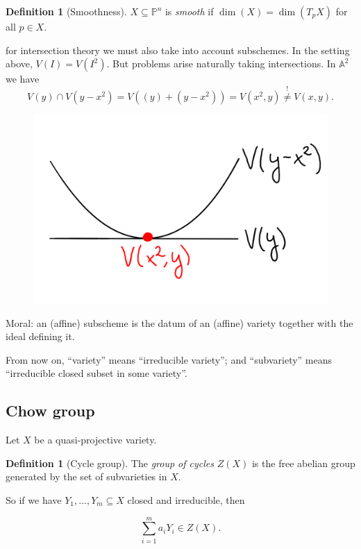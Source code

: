 \documentclass[12pt,a4paper]{amsart}
\theoremstyle{plain}
\theoremstyle{definition}
\newtheorem{defn}[thm]{Definition}
\theoremstyle{remark}
\begin{document}
\begin{defn}[Smoothness]
    $X\subseteq \mathbb{P}^{n}$ is \textit{smooth} if $\dim(X)=\dim(T_{p}X)$ for all $p\in X$.
\end{defn}

\underline{} for intersection theory we must also take into account subschemes.
In the setting above, $V(I)=V(I^{2})$.
But problems arise naturally taking intersections.
In $\mathbb{A}^{2}$ we have
\[ V(y)\cap V(y-x^{2})=V((y)+(y-x^{2}))=V(x^{2},y)\overset{!}{\neq} V(x,y). \]
\begin{figure}[H]
    \centering
    \includegraphics[scale=.15]{pictures/tangent}
\end{figure}

Moral: an (affine) subscheme is the datum of an (affine) variety together with the ideal defining it.

From now on, ``variety'' means ``irreducible variety''; and ``subvariety'' means ``irreducible closed subset in some variety''.

\subsection{Chow group}

Let $X$ be a quasi-projective variety.

\begin{defn}[Cycle group]
    The \textit{group of cycles} $Z(X)$ is the free abelian group generated by the set of subvarieties in $X$.
\end{defn}

So if we have $Y_{1},\ldots,Y_{m}\subseteq X$ closed and irreducible, then

\[ \sum_{i=1}^{m}a_{i}Y_{i} \in Z(X). \]
\end{document}
